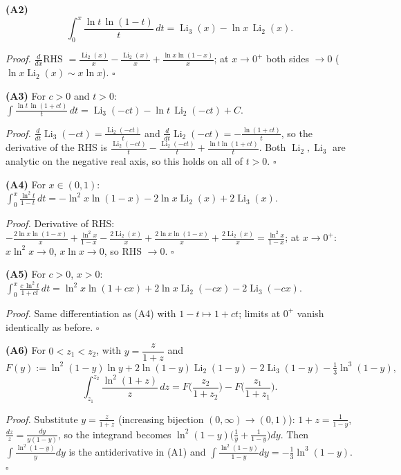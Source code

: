 \documentclass[11pt]{article}
\theoremstyle{remark}
\begin{document}
\textbf{(A2)}
\[
\int_0^x\frac{\ln t\,\ln(1-t)}{t}\,dt=\operatorname{Li}_3(x)-\ln x\,\operatorname{Li}_2(x).
\]

\textit{Proof.} $\frac{d}{dx}$RHS $=\frac{\operatorname{Li}_2(x)}{x}-\frac{\operatorname{Li}_2(x)}{x}+\frac{\ln x\ln(1-x)}{x}$; at $x\to0^+$ both sides $\to0$ ($\ln x\operatorname{Li}_2(x)\sim x\ln x$). $\square$

\textbf{(A3)} For $c>0$ and $t>0$: $\displaystyle\int\frac{\ln t\,\ln(1+ct)}{t}\,dt=\operatorname{Li}_3(-ct)-\ln t\,\operatorname{Li}_2(-ct)+C.$

\textit{Proof.} $\frac{d}{dt}\operatorname{Li}_3(-ct)=\frac{\operatorname{Li}_2(-ct)}{t}$ and $\frac{d}{dt}\operatorname{Li}_2(-ct)=-\frac{\ln(1+ct)}{t}$, so the derivative of the RHS is $\frac{\operatorname{Li}_2(-ct)}{t}-\frac{\operatorname{Li}_2(-ct)}{t}+\frac{\ln t\ln(1+ct)}{t}$. Both $\operatorname{Li}_2,\operatorname{Li}_3$ are analytic on the negative real axis, so this holds on all of $t>0$. $\square$

\textbf{(A4)} For $x\in(0,1)$: $\displaystyle\int_0^x\frac{\ln^2t}{1-t}\,dt=-\ln^2x\ln(1-x)-2\ln x\operatorname{Li}_2(x)+2\operatorname{Li}_3(x).$

\textit{Proof.} Derivative of RHS: $-\frac{2\ln x\ln(1-x)}{x}+\frac{\ln^2x}{1-x}-\frac{2\operatorname{Li}_2(x)}{x}+\frac{2\ln x\ln(1-x)}{x}+\frac{2\operatorname{Li}_2(x)}{x}=\frac{\ln^2x}{1-x}$; at $x\to0^+$: $x\ln^2x\to0$, $x\ln x\to0$, so RHS $\to0$. $\square$

\textbf{(A5)} For $c>0$, $x>0$: $\displaystyle\int_0^x\frac{c\,\ln^2t}{1+ct}\,dt=\ln^2x\ln(1+cx)+2\ln x\operatorname{Li}_2(-cx)-2\operatorname{Li}_3(-cx).$

\textit{Proof.} Same differentiation as (A4) with $1-t\mapsto 1+ct$; limits at $0^+$ vanish identically as before. $\square$

\textbf{(A6)} For $0<z_1<z_2$, with $y=\dfrac{z}{1+z}$ and
\[
F(y):=\ln^2(1-y)\ln y+2\ln(1-y)\operatorname{Li}_2(1-y)-2\operatorname{Li}_3(1-y)-\tfrac13\ln^3(1-y),
\]
\[
\int_{z_1}^{z_2}\frac{\ln^2(1+z)}{z}\,dz=F\!\Big(\frac{z_2}{1+z_2}\Big)-F\!\Big(\frac{z_1}{1+z_1}\Big).
\]

\textit{Proof.} Substitute $y=\frac{z}{1+z}$ (increasing bijection $(0,\infty)\to(0,1)$): $1+z=\frac1{1-y}$, $\frac{dz}{z}=\frac{dy}{y(1-y)}$, so the integrand becomes $\ln^2(1-y)\big(\frac1y+\frac1{1-y}\big)dy$. Then $\int\frac{\ln^2(1-y)}{y}dy$ is the antiderivative in (A1) and $\int\frac{\ln^2(1-y)}{1-y}dy=-\frac13\ln^3(1-y)$. $\square$
\end{document}

